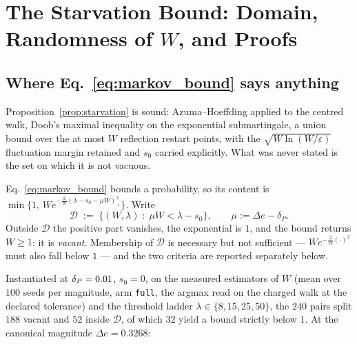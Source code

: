 
\section{The Starvation Bound: Domain, Randomness of \texorpdfstring{$W$}{W}, and Proofs}\label{sec:prop3}

\subsection{Where Eq.~\eqref{eq:markov_bound} says anything}\label{sec:prop3_domain}

Proposition~\ref{prop:starvation} is sound: Azuma--Hoeffding applied to the
centred walk, Doob's maximal inequality on the exponential submartingale, a
union bound over the at most $W$ reflection restart points, with the
$\sqrt{W \ln(W/\varepsilon)}$ fluctuation margin retained and $s_0$ carried
explicitly. What was never stated is the set on which it is not vacuous.

\begin{definition}\label{def:eq4_domain}
  Eq.~\eqref{eq:markov_bound} bounds a probability, so its content is
  $\min\{1,\, W e^{-\frac{2}{W}(\lambda - s_0 - \mu W)_+^2}\}$. Write
  \[
    \mathcal{D} \;:=\; \bigl\{ (W, \lambda) \;:\; \mu W < \lambda - s_0 \bigr\},
    \qquad \mu := \Delta e - \delta_P .
  \]
  Outside $\mathcal{D}$ the positive part vanishes, the exponential is $1$, and
  the bound returns $W \ge 1$: it is \emph{vacant}. Membership of $\mathcal{D}$
  is necessary but not sufficient --- $W e^{-\frac{2}{W}(\cdot)^2}$ must also
  fall below $1$ --- and the two criteria are reported separately below.
\end{definition}

Instantiated at $\delta_P = 0.01$, $s_0 = 0$, on the measured
estimators of $W$ (mean over $100$ seeds per magnitude, arm \texttt{full},
the argmax read on the charged walk at the declared tolerance) and
the threshold ladder $\lambda \in \{8, 15, 25, 50\}$, the $240$ pairs split
$188$ vacant and $52$ inside $\mathcal{D}$, of which $32$ yield a bound
strictly below $1$. At the canonical magnitude $\Delta e = 0.3268$:

